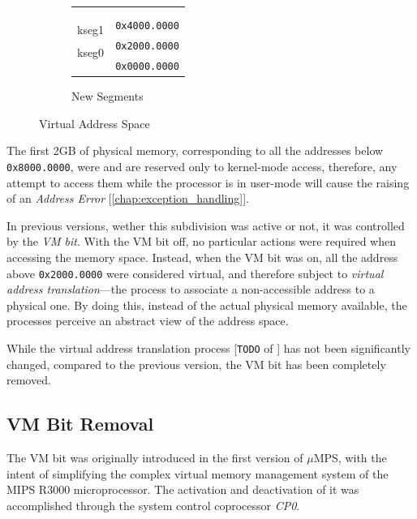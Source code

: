 \documentclass[12pt,a4paper,openright,twoside]{report}
\begin{document}
\begin{figure}[h]
\begin{subfigure}[b]{0.4\textwidth}
\begin{tabular}{cl}
        \multicolumn{1}{|c|}{} & \multirow{2}{*}{} \\
        \multicolumn{1}{|c|}{} &  \\
        \multicolumn{1}{|c|}{} & \multirow{2}{*}{\texttt{0x4000.0000}} \\ \cline{1-1}
        \multicolumn{1}{|c|}{\multirow{2}{*}{kseg1}} &  \\
        \multicolumn{1}{|c|}{} & \multirow{2}{*}{\texttt{0x2000.0000}} \\ \cline{1-1}
        \multicolumn{1}{|c|}{\multirow{2}{*}{kseg0}} &  \\
        \multicolumn{1}{|c|}{} & \multirow{2}{*}{\texttt{0x0000.0000}} \\ \cline{1-1}
        \multicolumn{1}{l}{} & 
        \end{tabular}
        \caption{New Segments}
        \label{fig:new_segments}
    \end{subfigure}
    \caption{Virtual Address Space}
    \label{fig:virtual_address_space}
\end{figure}

  The first 2GB of physical memory, corresponding to all the addresses below \texttt{0x8000.0000}, were and are reserved only to kernel-mode access, therefore, any attempt to access them while the processor is in user-mode will cause the raising of an \textit{Address Error} [\autoref{chap:exception_handling}].
  
  In previous versions, wether this subdivision was active or not, it was controlled by the \textit{VM bit}.
  With the VM bit off, no particular actions were required when accessing the memory space.
  Instead, when the VM bit was on, all the address above \texttt{0x2000.0000} were considered virtual, and therefore subject to \textit{virtual address translation}---the process to associate a non-accessible address to a physical one.
  By doing this, instead of the actual physical memory available, the processes perceive an abstract view of the address space.
  
  While the virtual address translation process [\texttt{TODO} of \cite{pops}] has not been significantly changed, compared to the previous version, the VM bit has been completely removed.
  
\subsection{VM Bit Removal}
  The VM bit was originally introduced in the first version of $\mu$MPS, with the intent of simplifying the complex virtual memory management system of the MIPS R3000 microprocessor.
  The activation and deactivation of it was accomplished through the system control coprocessor \textit{CP0}.
  
\end{document}
